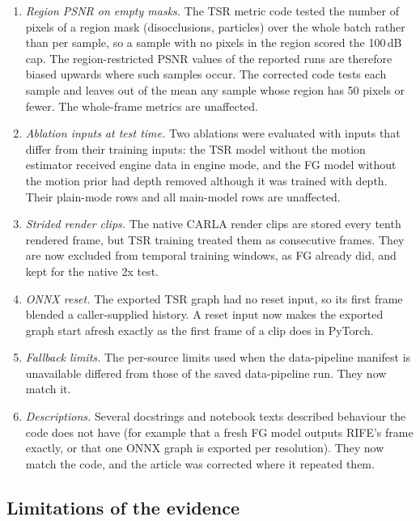 \begin{enumerate}
\item \emph{Region PSNR on empty masks.} The TSR metric code tested the number of pixels of a region mask (disocclusions, particles) over the whole batch rather than per sample, so a sample with no pixels in the region scored the 100\,dB cap. The region-restricted PSNR values of the reported runs are therefore biased upwards where such samples occur. The corrected code tests each sample and leaves out of the mean any sample whose region has 50 pixels or fewer. The whole-frame metrics are unaffected.
\item \emph{Ablation inputs at test time.} Two ablations were evaluated with inputs that differ from their training inputs: the TSR model without the motion estimator received engine data in engine mode, and the FG model without the motion prior had depth removed although it was trained with depth. Their plain-mode rows and all main-model rows are unaffected.
\item \emph{Strided render clips.} The native CARLA render clips are stored every tenth rendered frame, but TSR training treated them as consecutive frames. They are now excluded from temporal training windows, as FG already did, and kept for the native 2x test.
\item \emph{ONNX reset.} The exported TSR graph had no reset input, so its first frame blended a caller-supplied history. A reset input now makes the exported graph start afresh exactly as the first frame of a clip does in PyTorch.
\item \emph{Fallback limits.} The per-source limits used when the data-pipeline manifest is unavailable differed from those of the saved data-pipeline run. They now match it.
\item \emph{Descriptions.} Several docstrings and notebook texts described behaviour the code does not have (for example that a fresh FG model outputs RIFE's frame exactly, or that one ONNX graph is exported per resolution). They now match the code, and the article was corrected where it repeated them.
\end{enumerate}

\subsection{Limitations of the evidence}\label{sec:status-limits}

